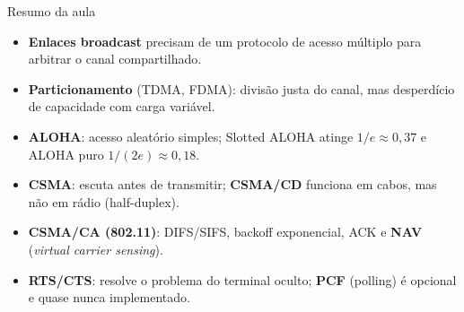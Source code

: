 \documentclass[aspectratio=169,11pt]{beamer}
\begin{document}
\begin{frame}{Resumo da aula}
  \begin{itemize}
    \item \textbf{Enlaces broadcast} precisam de um protocolo de acesso múltiplo para arbitrar o canal compartilhado.
    \item \textbf{Particionamento} (TDMA, FDMA): divisão justa do canal, mas desperdício de capacidade com carga variável.
    \item \textbf{ALOHA}: acesso aleatório simples; Slotted ALOHA atinge $1/e \approx 0{,}37$ e ALOHA puro $1/(2e) \approx 0{,}18$.
    \item \textbf{CSMA}: escuta antes de transmitir; \textbf{CSMA/CD} funciona em cabos, mas não em rádio (half-duplex).
    \item \textbf{CSMA/CA (802.11)}: DIFS/SIFS, backoff exponencial, ACK e \textbf{NAV} (\emph{virtual carrier sensing}).
    \item \textbf{RTS/CTS}: resolve o problema do terminal oculto; \textbf{PCF} (polling) é opcional e quase nunca implementado.
  \end{itemize}
\end{frame}
\end{document}
